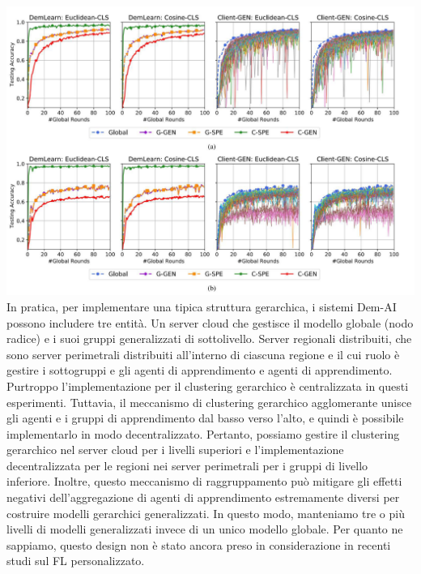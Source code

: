 \includegraphics[scale=0.4]{ClusteringLast} \vspace{0.5cm}
In pratica, per implementare una tipica struttura gerarchica, i sistemi Dem-AI possono includere tre entità. Un server cloud che gestisce il modello globale (nodo radice) e i suoi gruppi generalizzati di sottolivello. Server regionali distribuiti, che sono server perimetrali distribuiti all'interno di ciascuna regione e il cui ruolo è gestire i sottogruppi e gli agenti di apprendimento e agenti di apprendimento.
Purtroppo l'implementazione per il clustering gerarchico è centralizzata in questi esperimenti. Tuttavia, il meccanismo di clustering gerarchico agglomerante unisce gli agenti e i gruppi di apprendimento dal basso verso l'alto, e quindi è possibile implementarlo in modo decentralizzato. Pertanto, possiamo gestire il clustering gerarchico nel server cloud per i livelli superiori e l'implementazione decentralizzata per le regioni nei server perimetrali per i gruppi di livello inferiore. Inoltre, questo meccanismo di raggruppamento può mitigare gli effetti negativi dell'aggregazione di agenti di apprendimento estremamente diversi per costruire modelli gerarchici generalizzati. In questo modo, manteniamo tre o più livelli di modelli generalizzati invece di un unico modello globale. Per quanto ne sappiamo, questo design non è stato ancora preso in considerazione in recenti studi sul FL personalizzato.